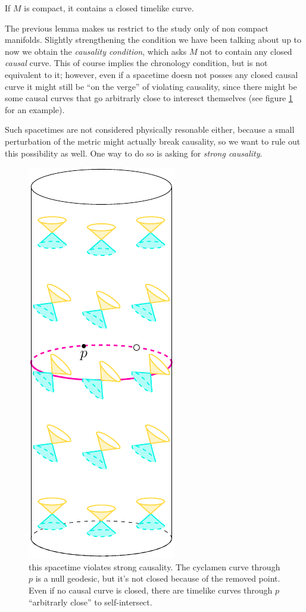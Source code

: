 \begin{lemma}
	If \(M\) is compact, it contains a closed timelike curve.
\end{lemma}
The previous lemma makes us restrict to the study only of non compact manifolds.
Slightly strengthening the condition we have been talking about up to now we obtain the \emph{causality condition}, which asks \(M\) not to contain any closed \emph{causal} curve. This of course implies the chronology condition, but is not equivalent to it; however, even if a spacetime doesn not posses any closed causal curve it might still be ``on the verge'' of violating causality, since there might be some causal curves that go arbitrarly close to interesct themselves (see figure \ref{fig:strong-causality} for an example).

Such spacetimes are not considered physically resonable either, because a small perturbation of the metric might actually break causality, so we want to rule out this possibility as well. One way to do so is asking for \emph{strong causality}.
\begin{figure}
	\centering
	\includegraphics[scale=1.1]{Immagini/strong-causality/strong-causality.pdf}
	\caption[]{this spacetime violates strong causality. The cyclamen curve through \(p\) is a null geodesic, but it's not closed because of the removed point. Even if no causal curve is closed, there are timelike curves through \(p\) ``arbitrarly close'' to self-intersect.}
	\label{fig:strong-causality}
\end{figure}
